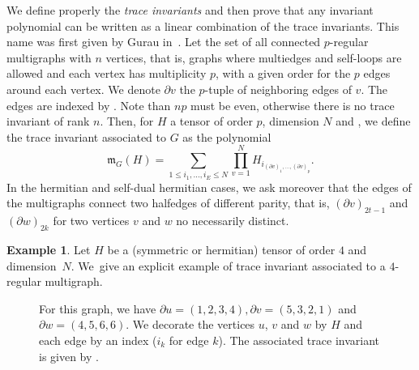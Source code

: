 \documentclass[pdftex]{sigma}
\numberwithin{equation}{section}
\theoremstyle{definition}
\newtheorem{Example}[Theorem]{Example}
\begin{document}
We define properly the {\em trace invariants} and then prove that any invariant polynomial can be written as a linear combination of the trace invariants. This name was first given by Gurau in~\cite{gurauarticle14}. Let  the set of all connected $p$-regular multigraphs with $n$ vertices, that is, graphs where multiedges and self-loops are allowed and each vertex has multiplicity $p$, with a given order for the $p$ edges around each vertex. We denote $\partial v$ the $p$-tuple of neighboring edges of $v$. The edges are indexed by . Note than $np$ must be even, otherwise there is no trace invariant of rank $n$. Then, for $H$ a tensor of order $p$, dimension $N$ and , we define the trace invariant associated to $G$ as the polynomial
\[ \mathfrak{m}_G(H)= \sum_{1 \leq i_1,\dots,i_E \leq N} \prod_{v=1}^N H_{i_{(\partial v)_1,\dots,(\partial v)_p}}. \]
In the hermitian and self-dual hermitian cases, we ask moreover that the edges of the multigraphs connect two halfedges of different parity, that is, $(\partial v)_{2t-1}$ and $(\partial w)_{2k}$ for two vertices $v$ and $w$ no necessarily distinct.
\begin{Example}\label{example2} Let $H$ be a (symmetric or hermitian) tensor of order $4$ and dimension~$N$. We~give an explicit example of trace invariant associated to a $4$-regular multigraph.
\begin{figure}[ht]
    \centering
{}
\caption{For this graph, we have $\partial u =(1,2,3,4), \partial v =(5,3,2,1)$ and $\partial w =(4,5,6,6)$. We decorate the vertices $u$, $v$ and $w$ by $H$ and each edge by an index ($i_k$ for edge $k$). The associated trace invariant is given by .}
\end{figure}
\end{Example}
\end{document}
